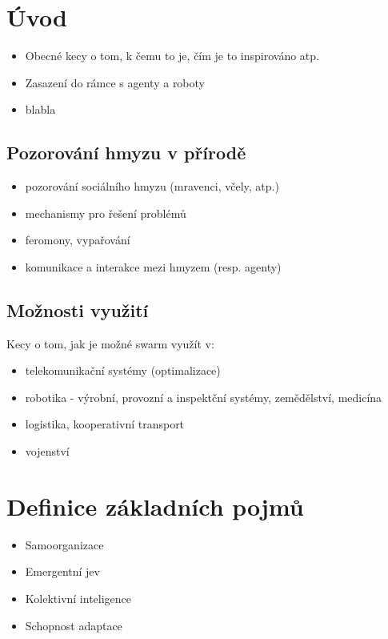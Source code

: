 \documentclass[a4paper,12pt]{article}
\let\stdsection\section
\renewcommand\section{\newpage\stdsection}
\begin{document}


\tableofcontents

\section{Úvod}
\begin{itemize}
  \item Obecné kecy o tom, k čemu to je, čím je to inspirováno atp.
  \item Zasazení do rámce s agenty a roboty
  \item blabla
\end{itemize}

\subsection{Pozorování hmyzu v přírodě}
\begin{itemize}
  \item pozorování sociálního hmyzu (mravenci, včely, atp.)
  \item mechanismy pro řešení problémů
  \item feromony, vypařování
  \item komunikace a interakce mezi hmyzem (resp. agenty)
\end{itemize}


\subsection{Možnosti využití}
Kecy o tom, jak je možné swarm využít v:
\begin{itemize}
  \item telekomunikační systémy (optimalizace)
  \item robotika - výrobní, provozní a inspektční systémy, zemědělství, medicína
  \item logistika, kooperativní transport
  \item vojenství
\end{itemize}



\section{Definice základních pojmů}
\begin{itemize}
  \item Samoorganizace 
  \item Emergentní jev
  \item Kolektivní inteligence
  \item Schopnost adaptace
\end{itemize}
\end{document}
